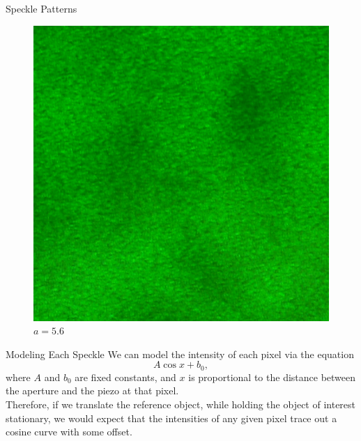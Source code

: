 \documentclass[pdf]{beamer}
\begin{document}
\begin{frame}{Speckle Patterns}
\begin{figure}[!htb]
  \caption{$a=16$}
\endminipage\hfill
{}
  \includegraphics[width=\linewidth]{apertures/5.png}
  \caption{$a=5.6$}
\endminipage
\end{figure}
\end{frame}

\begin{frame}{Modeling Each Speckle}
We can model the intensity of each pixel via the equation$$A\cos x + b_0,$$where $A$ and $b_0$ are fixed constants, and $x$ is proportional to the distance between the aperture and the piezo at that pixel.\\
\vspace{0.5cm}
Therefore, if we translate the reference object, while holding the object of interest stationary, we would expect that the intensities of any given pixel trace out a cosine curve with some offset.
\end{frame}
\end{document}
